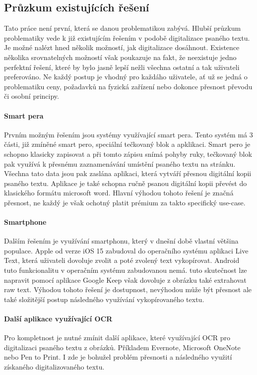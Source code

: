 \documentclass[journal]{IEEEtran}
\begin{document}
\subsection{Průzkum existujících řešení}
Tato práce není první, která se danou problematikou zabývá.
Hlubší průzkum problematiky vede k již existujícím řešením v podobě digitalizace psaného textu.
Je možné nalézt hned několik možností, jak digitalizace dosáhnout.
Existence několika srovnatelných možností však poukazuje na fakt, že neexistuje jedno perfektní řešení, které by bylo jasně lepší nežli všechna ostatní a tak uživateli preferováno.
Ne každý postup je vhodný pro každáho uživatele, ať už se jedná o problematiku ceny, požadavků na fyzická zařízení nebo dokonce přesnost převodu či osobní principy.\cite{aarp_digitalization, popupalr_science_digitalization_with_pens}

\paragraph{Smart pera}
Prvním možným řešením jsou systémy využívající smart pera.
Tento systém má 3 části, již zmíněné smart pero, speciální tečkovaný blok a apklikaci.
Smart pero je schopno klasicky zapisovat a při tomto zápisu snímá pohyby ruky, tečkovaný blok pak využívá k přesnému zaznamenávání umístění psaného textu na stránku. Všechna tato data jsou pak zaslána aplikaci, která vytváří přesnou digitální kopii psaného textu. Aplikace je také schopna ručně psanou digitální kopii převést do klasického formátu microsoft word. Hlavní výhodou tohoto řešení je značná přesnost, ne každý je však ochotný platit prémium za takto specifický use-case.\cite{popupalr_science_digitalization_with_pens}

\paragraph{Smartphone}
Dalším řešením je využívání smartphonu, který v dnešní době vlastní většina populace.
Apple od verze iOS 15 zabudoval do operačního systému aplikaci Live Text, která uživateli dovoluje zvolit a poté zvolený text vykopírovat.
Android  tuto funkcionalitu v operačním systému zabudovanou nemá. tuto skutečnost lze napravit pomocí aplikace Google Keep však dovoluje z obrázku také extrahovat raw text.\cite{aarp_digitalization, google_keep}
Výhodou tohoto řešení je dostupnost, nevýhodou může být přesnost ale také složitější postup následného využívání vykopírovaného textu.

\paragraph{Další aplikace využívající OCR}
Pro kompletnost je nutné zmínit další aplikace, které využívající \ac{OCR} pro digitalizaci psaného textu z obrázků. Příkladem Evernote\cite{evernote}, Microsoft OneNote\cite{onenote} nebo Pen to Print\cite{pen_to_print}.
I zde je bohužel problém přesnosti a následného využití získaného digitalizovaného textu.
\end{document}
